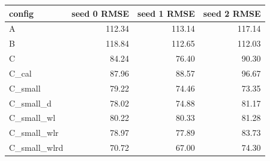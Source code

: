 \begin{tabular}{lrrr}
\toprule
config & seed 0 RMSE & seed 1 RMSE & seed 2 RMSE \\
\midrule
A & 112.34 & 113.14 & 117.14 \\
B & 118.84 & 112.65 & 112.03 \\
C & 84.24 & 76.40 & 90.30 \\
C\_cal & 87.96 & 88.57 & 96.67 \\
C\_small & 79.22 & 74.46 & 73.35 \\
C\_small\_d & 78.02 & 74.88 & 81.17 \\
C\_small\_wl & 80.22 & 80.33 & 81.28 \\
C\_small\_wlr & 78.97 & 77.89 & 83.73 \\
C\_small\_wlrd & 70.72 & 67.00 & 74.30 \\
\bottomrule
\end{tabular}
